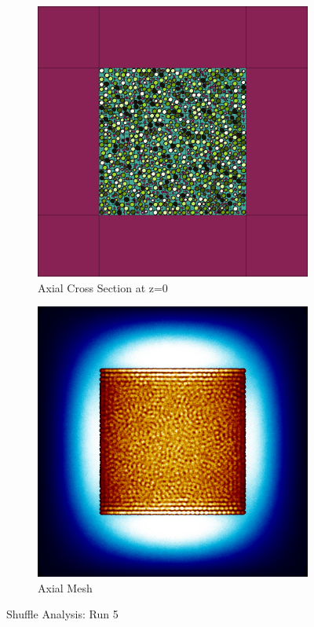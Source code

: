\begin{figure}[H]
\begin{subfigure}{0.45\textwidth}
  \includegraphics[width=0.95\linewidth]{figures/5601234/5601234-v}
  \caption{Axial Cross Section at z=0 }
  \label{fig:5601234-v}
\end{subfigure}
%
\begin{subfigure}{0.45\textwidth}
  \includegraphics[width=0.95\linewidth]{figures/5601234/5601234-vm}
  \caption{Axial Mesh}
  \label{fig:5601234-vm}
\end{subfigure}
%
\caption{Shuffle Analysis: Run 5}
\label{fig:5601234}
\end{figure}